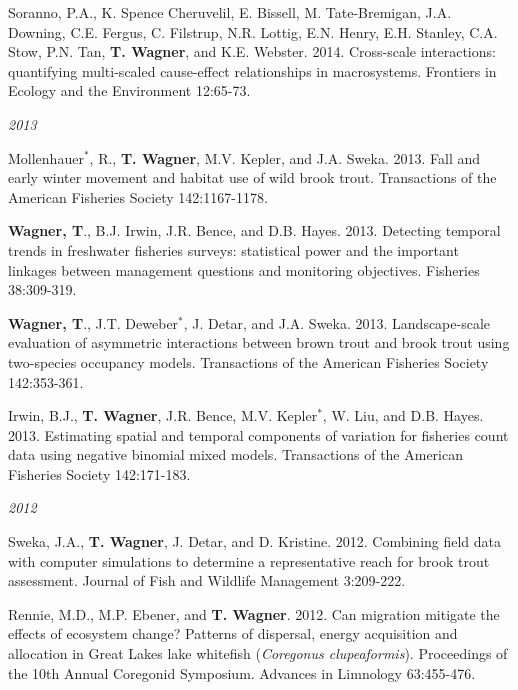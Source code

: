 \documentclass[10pt]{article}
\begin{document}
\begin{flushleft}
\begin{etaremune}[start=41]
\item Soranno, P.A., K. Spence Cheruvelil, E. Bissell, M. Tate-Bremigan, J.A. Downing, C.E. Fergus, C. Filstrup, N.R. Lottig, E.N. Henry, E.H. Stanley, C.A. Stow, P.N. Tan, {\bf T. Wagner}, and K.E. Webster. 2014. Cross-scale interactions: quantifying multi-scaled cause-effect relationships in macrosystems. Frontiers in Ecology and the Environment 12:65-73. 

\end{etaremune}
\emph{2013}
\begin{etaremune}[start=28]
\item Mollenhauer$^*$, R., {\bf T. Wagner}, M.V. Kepler, and J.A. Sweka. 2013. Fall and early winter movement and habitat use of wild brook trout. Transactions of the American Fisheries Society 142:1167-1178.

\item {\bf Wagner, T}., B.J. Irwin, J.R. Bence, and D.B. Hayes. 2013. Detecting temporal trends in freshwater fisheries surveys: statistical power and the important linkages between management questions and monitoring objectives. Fisheries 38:309-319.

\item {\bf Wagner, T}., J.T. Deweber$^*$, J. Detar, and J.A. Sweka. 2013. Landscape-scale evaluation of asymmetric interactions between brown trout and brook trout using two-species occupancy models. Transactions of the American Fisheries Society 142:353-361.

\item Irwin, B.J., {\bf T. Wagner}, J.R. Bence, M.V. Kepler$^*$, W. Liu, and D.B. Hayes. 2013. Estimating spatial and temporal components of variation for fisheries count data using negative binomial mixed models. Transactions of the American Fisheries Society 142:171-183.

\end{etaremune}
\emph{2012}
\begin{etaremune}[start=24]
\item Sweka, J.A., {\bf T. Wagner}, J. Detar, and D. Kristine. 2012. Combining field data with computer simulations to determine a representative reach for brook trout assessment. Journal of Fish and Wildlife Management 3:209-222.

\item Rennie, M.D., M.P. Ebener, and {\bf T. Wagner}. 2012. Can migration mitigate the effects of ecosystem change? Patterns of dispersal, energy acquisition and allocation in Great Lakes lake whitefish (\emph{Coregonus clupeaformis}). Proceedings of the 10th Annual Coregonid Symposium. Advances in Limnology 63:455-476. 


\end{etaremune}
\end{flushleft}
\end{document}
